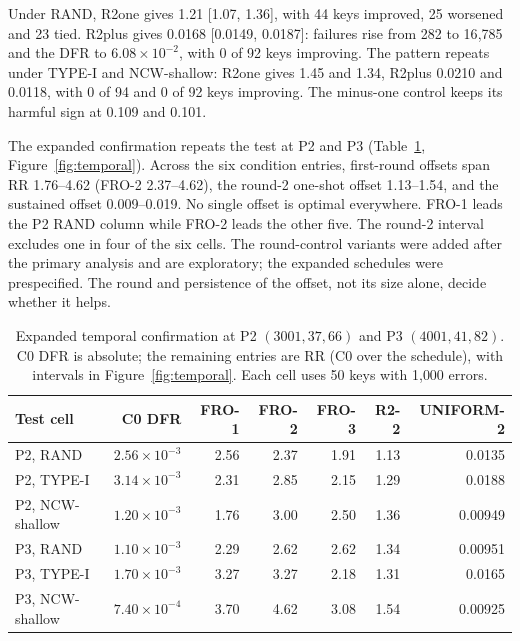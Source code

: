 Under RAND, R2one gives 1.21 [1.07, 1.36], with 44 keys improved, 25 worsened and 23 tied. R2plus gives 0.0168 [0.0149, 0.0187]: failures rise from 282 to 16{,}785 and the DFR to $6.08\times10^{-2}$, with 0 of 92 keys improving. The pattern repeats under TYPE-I and NCW-shallow: R2one gives 1.45 and 1.34, R2plus 0.0210 and 0.0118, with 0 of 94 and 0 of 92 keys improving. The minus-one control keeps its harmful sign at 0.109 and 0.101.

The expanded confirmation repeats the test at P2 and P3 (Table~\ref{tab:temporal}, Figure~\ref{fig:temporal}). Across the six condition entries, first-round offsets span RR 1.76--4.62 (FRO-2 2.37--4.62), the round-2 one-shot offset 1.13--1.54, and the sustained offset 0.009--0.019. No single offset is optimal everywhere. FRO-1 leads the P2 RAND column while FRO-2 leads the other five. The round-2 interval excludes one in four of the six cells. The round-control variants were added after the primary analysis and are exploratory; the expanded schedules were prespecified. The round and persistence of the offset, not its size alone, decide whether it helps.



\begin{table}[!t]
\centering
\small
\caption{Expanded temporal confirmation at P2 $(3001,37,66)$ and P3 $(4001,41,82)$. C0 DFR is absolute; the remaining entries are RR (C0 over the schedule), with intervals in Figure~\ref{fig:temporal}. Each cell uses 50 keys with 1{,}000 errors.}
\label{tab:temporal}
\begin{tabular}{l r rrrrr}
\toprule
Test cell & C0 DFR & FRO-1 & FRO-2 & FRO-3 & R2-2 & UNIFORM-2 \\
\midrule
P2, RAND & $2.56\times10^{-3}$ & 2.56 & 2.37 & 1.91 & 1.13 & 0.0135 \\
P2, TYPE-I & $3.14\times10^{-3}$ & 2.31 & 2.85 & 2.15 & 1.29 & 0.0188 \\
P2, NCW-shallow & $1.20\times10^{-3}$ & 1.76 & 3.00 & 2.50 & 1.36 & 0.00949 \\
P3, RAND & $1.10\times10^{-3}$ & 2.29 & 2.62 & 2.62 & 1.34 & 0.00951 \\
P3, TYPE-I & $1.70\times10^{-3}$ & 3.27 & 3.27 & 2.18 & 1.31 & 0.0165 \\
P3, NCW-shallow & $7.40\times10^{-4}$ & 3.70 & 4.62 & 3.08 & 1.54 & 0.00925 \\
\bottomrule
\end{tabular}
\end{table}

